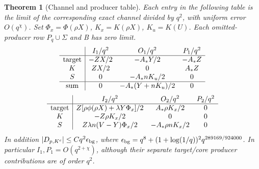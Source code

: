\documentclass[11pt]{article}
\newtheorem{theorem}{Theorem}\newtheorem{lemma}{Lemma}
\begin{document}
\begin{theorem}[Channel and producer table]\label{an01cpdv1:table}
Each entry in the following table is the limit of the corresponding
exact channel divided by \(q^2\), with uniform error \(O(q^\chi)\).
Set \(\Phi_x=\Phi(\rho X)\), \(K_x=K(\rho X)\), \(K_u=K(U)\).
Each omitted-producer row \(P_q\cup\Sigma\) and B has zero limit.
\[
\begin{array}{c|ccc}
 &I_1/q^2&O_1/q^2&P_1/q^2\\ \hline
{\rm target}&-ZX/2&-A_*Y/2&-A_*Z\\
K&ZX/2&0&A_*Z\\
S&0&-A_*nK_u/2&0\\ \hline
{\rm sum}&0&-A_*(Y+nK_u)/2&0
\end{array}
\]
\[
\begin{array}{c|ccc}
 &I_2/q^2&O_2/q^2&P_2/q^2\\ \hline
{\rm target}&Z[\rho\phi(\rho X)+\lambda Y\Phi_x]/2&
 A_*\rho K_x/2&0\\
K&-Z\rho K_x/2&0&0\\
S&Z\lambda n(V-Y)\Phi_x/2&-A_*\rho nK_x/2&0
\end{array}
\]
In addition \(|D_{p,K^c}|\le Cq^2\epsilon_{\rm bg}\), where
\(\epsilon_{\rm bg}=q^8+(1+\log(1/q))^2q^{289169/924000}\).
In particular \(I_1,P_1=O(q^{2+\chi})\), although their separate
target/core producer contributions are of order \(q^2\).
\end{theorem}
\end{document}
